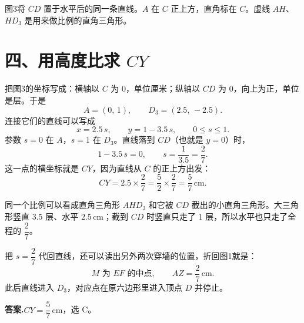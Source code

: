 \documentclass[11pt,a4paper,fontset=none]{ctexart}
\begin{document}
\begin{center}

\vspace{0.45em}
{\small\color{Ink}图3\quad 将 \(CD\) 置于水平后的同一条直线。\(A\) 在 \(C\) 正上方，直角标在 \(C\)。虚线 \(AH\)、\(HD_3\) 是用来做比例的直角三角形。}
\end{center}

\section*{四、用高度比求 \(CY\)}

把图3的坐标写成：横轴以 \(C\) 为 \(0\)，单位厘米；纵轴以 \(CD\) 为 \(0\)，向上为正，单位是层。于是
\[
  A=(0,\,1),\qquad D_3=(2.5,\,-2.5).
\]
连接它们的直线可以写成
\[
  x=2.5\,s,\qquad y=1-3.5\,s,\qquad 0\le s\le 1.
\]
参数 \(s=0\) 在 \(A\)，\(s=1\) 在 \(D_3\)。直线落到 \(CD\)（也就是 \(y=0\)）时，
\[
  1-3.5\,s=0,\qquad s=\frac{1}{3.5}=\frac{2}{7}.
\]
这一点的横坐标就是 \(CY\)，因为直线从 \(C\) 的正上方出发：
\[
  CY=2.5\times\frac{2}{7}=\frac{5}{2}\times\frac{2}{7}=\frac{5}{7}\,\mathrm{cm}.
\]

同一个比例可以看成直角三角形 \(AHD_3\) 和它被 \(CD\) 截出的小直角三角形。大三角形竖直 \(3.5\) 层、水平 \(2.5\,\mathrm{cm}\)；截到 \(CD\) 时竖直只走了 \(1\) 层，所以水平也只走了全程的 \(\dfrac{2}{7}\)。

把 \(s=\dfrac{2}{7}\) 代回直线，还可以读出另外两次穿墙的位置，折回图1就是：
\[
  M\text{ 为 }EF\text{ 的中点},\qquad AZ=\frac{2}{7}\,\mathrm{cm}.
\]
此后直线进入 \(D_3\)，对应点在原六边形里进入顶点 \(D\) 并停止。

\begin{tcolorbox}[
  colback=Mint,
  colframe=TealDark,
  boxrule=0.6pt,
  arc=2pt,
  left=8pt,right=8pt,top=6pt,bottom=6pt
]
\textbf{答案.}\quad \(CY=\dfrac{5}{7}\,\mathrm{cm}\)，选 C。
\end{tcolorbox}
\end{document}
